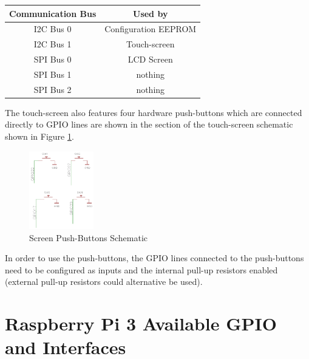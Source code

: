 \documentclass{article}
\begin{document}
	\begin{table}
		\centering
		
		\begin{tabular}[H]{| c | c |}
			\hline
			\textbf{Communication Bus} & \textbf{Used by} \\
			\hline
			I2C Bus 0 & Configuration EEPROM \\
			\hline
			I2C Bus 1 & Touch-screen \\
			\hline
			SPI Bus 0 & LCD Screen \\
			\hline
			SPI Bus 1 & nothing \\
			\hline
			SPI Bus 2 & nothing \\
			\hline
		\end{tabular}
	\end{table}


The touch-screen also features four hardware push-buttons which are connected directly to GPIO lines are shown in the section of the touch-screen schematic shown in Figure \ref{Push_buttons_schematic}.


	\begin{figure}[H]
		\centering
		\includegraphics[width=0.25\textwidth]{pics/PiTFT_2-8_push-buttons_section_schematic.png}
		\caption{Screen Push-Buttons Schematic}
		\label{Push_buttons_schematic}
	\end{figure}


In order to use the push-buttons, the GPIO lines connected to the push-buttons need to be configured as inputs and the internal pull-up resistors enabled (external pull-up resistors could alternative be used).



\section{Raspberry Pi 3 Available GPIO and Interfaces}
\end{document}
